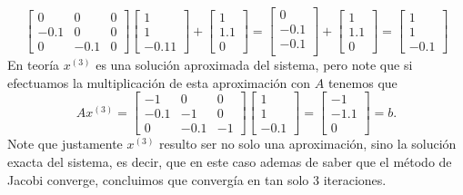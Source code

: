 \begin{enumerate}
\begin{solution}
$$\begin{bmatrix}
           0&0&0\\
           -0.1&0&0\\
           0&-0.1&0
       \end{bmatrix}\begin{bmatrix}
            1\\
            1\\
            -0.11
        \end{bmatrix}+\begin{bmatrix}
            1\\
            1.1\\
            0
            \end{bmatrix}=\begin{bmatrix}
           0\\
           -0.1\\
           -0.1\\
        \end{bmatrix}+\begin{bmatrix}
            1\\
            1.1\\
            0
        \end{bmatrix}=\begin{bmatrix}
            1\\
            1\\
            -0.1
        \end{bmatrix}$$
        En teoría $x^{(3)}$ es una solución aproximada del sistema, pero note que si efectuamos la multiplicación de esta aproximación con $A$ tenemos que
        $$Ax^{(3)}=\begin{bmatrix}
           -1&0&0\\
           -0.1&-1&0\\
           0&-0.1&-1
       \end{bmatrix}\begin{bmatrix}
            1\\
            1\\
            -0.1
        \end{bmatrix}=\begin{bmatrix}
            -1\\
            -1.1\\
            0
        \end{bmatrix}=b.$$
        Note que justamente $x^{(3)}$ resulto ser no solo una aproximación, sino la solución exacta del sistema, es decir, que en este caso ademas de saber que el método de Jacobi converge, concluimos que convergía en tan solo 3 iteraciones.
        
    \end{solution}
\end{enumerate}
